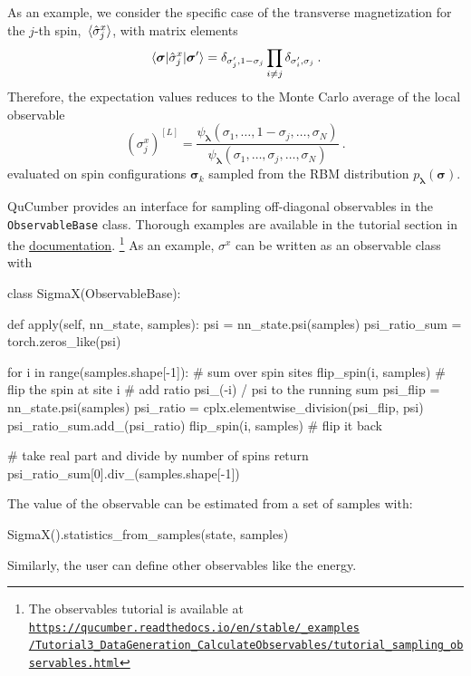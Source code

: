\documentclass[submission, Phys, hidelnks]{SciPost}
\begin{document}
As an example, we consider the specific case of the transverse magnetization
for the $j$-th spin, $\ev*{\hat{\sigma}^x_j}$, with matrix elements
\begin{equation}
    \mel{\bm{\sigma}}{\hat{\sigma}^x_j}{\bm{\sigma}^{\prime}}=\delta_{\sigma_j^\prime,1-\sigma_j}\prod_{i\ne j}\delta_{\sigma_i^\prime,\sigma_j}\:.
\end{equation}
Therefore, the expectation values reduces to the Monte Carlo average of the
local observable
\begin{equation}
    {(\sigma^x_j)}^{[L]}=\frac{\psi_{\bm{\lambda}}(\sigma_1,\dots,1-\sigma_j,\dots,\sigma_N)}
    {\psi_{\bm{\lambda}}(\sigma_1,\dots,\sigma_j,\dots,\sigma_N)}
\:.
\end{equation}
evaluated on spin configurations $\bm{\sigma}_k$ sampled from the RBM
distribution $p_{\bm{\lambda}}(\bm{\sigma})$.

QuCumber provides an interface for sampling off-diagonal observables in the
\verb|ObservableBase| class. Thorough examples are available in the tutorial
section in the \href{https://qucumber.readthedocs.io/en/stable/}{documentation}.\!\!
\footnote{The observables tutorial is available at
    \href{https://qucumber.readthedocs.io/en/stable/\_examples/Tutorial3\_DataGeneration\_CalculateObservables/tutorial\_sampling\_observables.html
}{\texttt{https://qucumber.readthedocs.io/en/stable/\_examples\\/Tutorial3\_DataGeneration\_CalculateObservables/tutorial\_sampling\_observables.html}}
}
As an example, $\sigma^x$ can be written as an observable class with
\begin{python}
class SigmaX(ObservableBase):

    def apply(self, nn_state, samples):
        psi = nn_state.psi(samples)
        psi_ratio_sum = torch.zeros_like(psi)

        for i in range(samples.shape[-1]):  # sum over spin sites
            flip_spin(i, samples)  # flip the spin at site i
            # add ratio psi_(-i) / psi to the running sum
            psi_flip = nn_state.psi(samples)
            psi_ratio = cplx.elementwise_division(psi_flip, psi)
            psi_ratio_sum.add_(psi_ratio)
            flip_spin(i, samples)  # flip it back

        # take real part and divide by number of spins
        return psi_ratio_sum[0].div_(samples.shape[-1])
\end{python}
The value of the observable can be estimated from a set of samples with:
\begin{python}
SigmaX().statistics_from_samples(state, samples)
\end{python}
Similarly, the user can define other observables like the energy.
\end{document}
